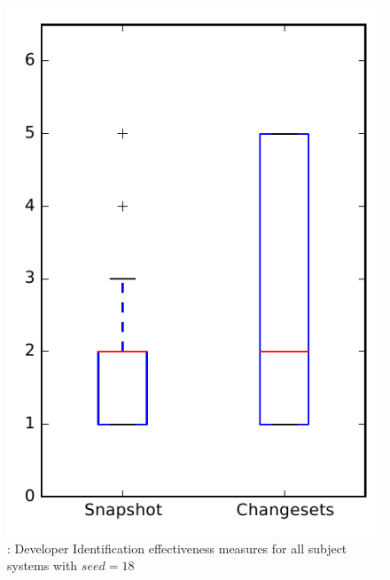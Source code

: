 
\begin{figure}
\centering
\includegraphics[height=0.4\textheight]{figures/dit_seed/rq1_overview_18}
\caption{\rtwo: Developer Identification effectiveness measures for all subject systems with $seed=18$}
\label{fig:dit_seed:rq1:overview}
\end{figure}
